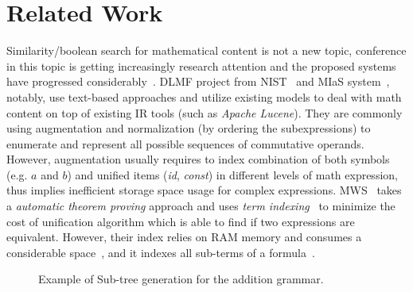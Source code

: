 \documentclass{acm_proc_article-sp}
\begin{document}
\section{Related Work}
Similarity/boolean search for mathematical content is not a new topic,
conference in this topic is getting increasingly research attention and the proposed systems have progressed considerably~\cite{ov}.
DLMF project from NIST~\cite{Youssef03,Youssef05} and MIaS system~\cite{mias11a,mias11,mias:thesis}, notably, use text-based approaches and utilize existing models to deal with math content on top of existing IR tools (such as \textit{Apache Lucene}). 
They are commonly using augmentation and normalization (by ordering the subexpressions) to enumerate and represent all possible sequences of commutative operands.
However, augmentation usually requires to index combination of both symbols (e.g. $a$ and $b$) and unified items (\textit{id}, \textit{const}) in different levels of math expression, thus implies inefficient storage space usage for complex expressions.
MWS~\cite{Kohlhase06,Kohlhase0p4,Kohlhase0p5} takes a \textit{automatic theorem proving} approach and uses \textit{term indexing}~\cite{graf96} to minimize the cost of unification algorithm which is able to find if two expressions are equivalent. However, their index relies on RAM memory and consumes a considerable space~\cite{Kohlhase0p5}, and it indexes all sub-terms of a formula~\cite{Kohlhase06}.

\begin{figure}
\caption{Example of Sub-tree generation for the addition grammar.}
\end{figure}


\end{document}
